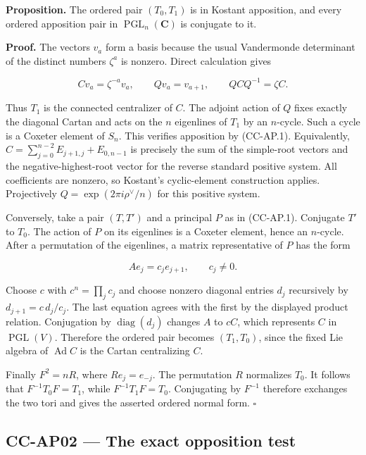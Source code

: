 \documentclass[11pt,a4paper]{article}
\theoremstyle{definition}\newtheorem{definition}[theorem]{Definition}
\theoremstyle{remark}\newtheorem{remark}[theorem]{Remark}
\begin{document}
\textbf{Proposition.} The ordered pair \((T_0,T_1)\) is in Kostant
apposition, and every ordered apposition pair in
\(\operatorname{PGL}_n(\mathbf C)\) is conjugate to it.

\textbf{Proof.} The vectors \(v_a\) form a basis because the usual
Vandermonde determinant of the distinct numbers \(\zeta^a\) is nonzero.
Direct calculation gives

\[
 Cv_a=\zeta^{-a}v_a,\qquad Qv_a=v_{a+1},
 \qquad QCQ^{-1}=\zeta C.
\]

Thus \(T_1\) is the connected centralizer of \(C\). The adjoint action
of \(Q\) fixes exactly the diagonal Cartan and acts on the \(n\)
eigenlines of \(T_1\) by an \(n\)-cycle. Such a cycle is a Coxeter
element of \(S_n\). This verifies apposition by (CC-AP.1). Equivalently,
\(C=\sum_{j=0}^{n-2}E_{j+1,j}+E_{0,n-1}\) is precisely the sum of the
simple-root vectors and the negative-highest-root vector for the reverse
standard positive system. All coefficients are nonzero, so Kostant's
cyclic-element construction applies. Projectively
\(Q=\exp(2\pi i\rho^\vee/n)\) for this positive system.

Conversely, take a pair \((T,T')\) and a principal \(P\) as in
(CC-AP.1). Conjugate \(T'\) to \(T_0\). The action of \(P\) on its
eigenlines is a Coxeter element, hence an \(n\)-cycle. After a
permutation of the eigenlines, a matrix representative of \(P\) has the
form

\[
 A e_j=c_j e_{j+1},\qquad c_j\ne0.
\]

Choose \(c\) with \(c^n=\prod_jc_j\) and choose nonzero diagonal entries
\(d_j\) recursively by \(d_{j+1}=c\,d_j/c_j\). The last equation agrees
with the first by the displayed product relation. Conjugation by
\(\operatorname{diag}(d_j)\) changes \(A\) to \(cC\), which represents
\(C\) in \(\operatorname{PGL}(V)\). Therefore the ordered pair becomes
\((T_1,T_0)\), since the fixed Lie algebra of \(\operatorname{Ad}C\) is
the Cartan centralizing \(C\).

Finally \(F^2=nR\), where \(Re_j=e_{-j}\). The permutation \(R\)
normalizes \(T_0\). It follows that \(F^{-1}T_0F=T_1\), while
\(F^{-1}T_1F=T_0\). Conjugating by \(F^{-1}\) therefore exchanges the
two tori and gives the asserted ordered normal form. \(\square\)

\subsection{CC-AP02 --- The exact opposition
test}\label{cc-ap02-the-exact-opposition-test}
\end{document}
